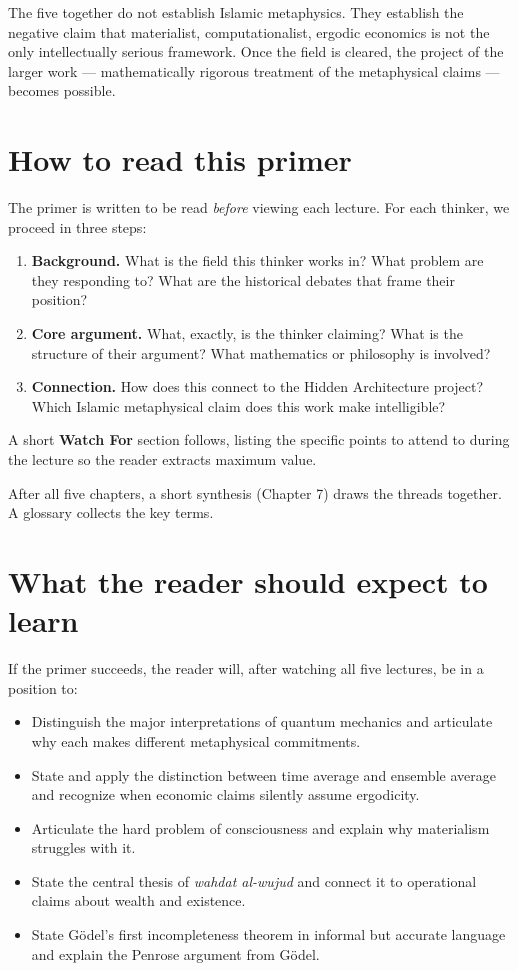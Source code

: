 \documentclass[11pt,a4paper]{book}
\theoremstyle{cleanrm}
\begin{document}
The five together do not establish Islamic metaphysics. They establish
the negative claim that materialist, computationalist, ergodic
economics is not the only intellectually serious framework. Once the
field is cleared, the project of the larger work --- mathematically
rigorous treatment of the metaphysical claims --- becomes possible.

\section{How to read this primer}

The primer is written to be read \emph{before} viewing each lecture.
For each thinker, we proceed in three steps:

\begin{enumerate}[leftmargin=2em]
    \item \textbf{Background.} What is the field this thinker works
    in? What problem are they responding to? What are the historical
    debates that frame their position?
    \item \textbf{Core argument.} What, exactly, is the thinker
    claiming? What is the structure of their argument? What
    mathematics or philosophy is involved?
    \item \textbf{Connection.} How does this connect to the Hidden
    Architecture project? Which Islamic metaphysical claim does this
    work make intelligible?
\end{enumerate}

A short \textbf{Watch For} section follows, listing the specific
points to attend to during the lecture so the reader extracts
maximum value.

After all five chapters, a short synthesis (Chapter 7) draws the
threads together. A glossary collects the key terms.

\section{What the reader should expect to learn}

If the primer succeeds, the reader will, after watching all five
lectures, be in a position to:

\begin{itemize}[leftmargin=2em]
    \item Distinguish the major interpretations of quantum mechanics
    and articulate why each makes different metaphysical commitments.
    \item State and apply the distinction between time average and
    ensemble average and recognize when economic claims silently
    assume ergodicity.
    \item Articulate the hard problem of consciousness and explain why
    materialism struggles with it.
    \item State the central thesis of \emph{wahdat al-wujud} and connect
    it to operational claims about wealth and existence.
    \item State G\"odel's first incompleteness theorem in informal but
    accurate language and explain the Penrose argument from G\"odel.
\end{itemize}
\end{document}
